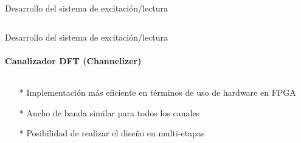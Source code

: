 \documentclass[ignorenonframetext,12pt]{beamer}
\begin{document}
\begin{frame}{Desarrollo del sistema de excitación/lectura}
\begin{columns}
\begin{column}{0.5\textwidth}
\begin{center}
					\end{center}
				\end{column}
			\end{columns}

		\end{frame}


		\begin{frame}{Desarrollo del sistema de excitación/lectura}
			\framesubtitle{Canalizador DFT (Channelizer)}
			\begin{columns}
				\begin{column}{0.4\textwidth}
					\begin{itemize}
						\item[*] Implementación m\'as eficiente en t\'erminos de uso de hardware en FPGA
						\item[*] Ancho de banda similar para todos los canales 
						\item[*] Posibilidad de realizar el diseño en multi-etapas
					\end{itemize}
				\end{column}
				\begin{column}{0.6\textwidth}


\end{column}
\end{columns}
\end{frame}
\end{document}
